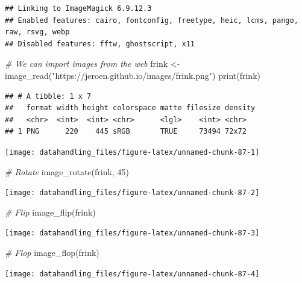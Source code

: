 \documentclass[
  12pt,
]{style/krantz}
\newenvironment{Shaded}{\begin{snugshade}}{\end{snugshade}}
\newcommand{\CommentTok}[1]{\textcolor[rgb]{0.56,0.35,0.01}{\textit{#1}}}
\newcommand{\DecValTok}[1]{\textcolor[rgb]{0.00,0.00,0.81}{#1}}
\newcommand{\FunctionTok}[1]{\textcolor[rgb]{0.00,0.00,0.00}{#1}}
\newcommand{\NormalTok}[1]{#1}
\newcommand{\OtherTok}[1]{\textcolor[rgb]{0.56,0.35,0.01}{#1}}
\newcommand{\StringTok}[1]{\textcolor[rgb]{0.31,0.60,0.02}{#1}}
\begin{document}
\begin{verbatim}
## Linking to ImageMagick 6.9.12.3
## Enabled features: cairo, fontconfig, freetype, heic, lcms, pango, raw, rsvg, webp
## Disabled features: fftw, ghostscript, x11
\end{verbatim}

\begin{Shaded}
\begin{Highlighting}[]
\CommentTok{\# We can import images from the web}
\NormalTok{frink }\OtherTok{\textless{}{-}} \FunctionTok{image\_read}\NormalTok{(}\StringTok{"https://jeroen.github.io/images/frink.png"}\NormalTok{)}
\FunctionTok{print}\NormalTok{(frink)}
\end{Highlighting}
\end{Shaded}

\begin{verbatim}
## # A tibble: 1 x 7
##   format width height colorspace matte filesize density
##   <chr>  <int>  <int> <chr>      <lgl>    <int> <chr>  
## 1 PNG      220    445 sRGB       TRUE     73494 72x72
\end{verbatim}

\texttt{[image: datahandling\_files/figure-latex/unnamed-chunk-87-1]}

\begin{Shaded}
\begin{Highlighting}[]
\CommentTok{\# Rotate}
\FunctionTok{image\_rotate}\NormalTok{(frink, }\DecValTok{45}\NormalTok{)}
\end{Highlighting}
\end{Shaded}

\texttt{[image: datahandling\_files/figure-latex/unnamed-chunk-87-2]}

\begin{Shaded}
\begin{Highlighting}[]
\CommentTok{\# Flip}
\FunctionTok{image\_flip}\NormalTok{(frink)}
\end{Highlighting}
\end{Shaded}

\texttt{[image: datahandling\_files/figure-latex/unnamed-chunk-87-3]}

\begin{Shaded}
\begin{Highlighting}[]
\CommentTok{\# Flop}
\FunctionTok{image\_flop}\NormalTok{(frink)}
\end{Highlighting}
\end{Shaded}

\texttt{[image: datahandling\_files/figure-latex/unnamed-chunk-87-4]}
\end{document}
